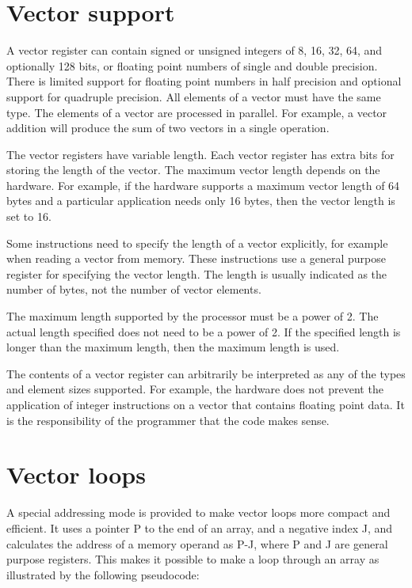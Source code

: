 \documentclass[forwardcom.tex]{subfiles}
\begin{document}
\section{Vector support}
A vector register can contain signed or unsigned integers of 8, 16, 32, 64, and optionally 128 bits, or floating point numbers of single and double precision. There is limited support for floating point numbers in half precision and optional support for quadruple precision. All elements of a vector must have the same type. The elements of a vector are processed in parallel. For example, a vector addition will produce the sum of two vectors in a single operation.
\vv

The vector registers have variable length. Each vector register has extra bits for storing the length of the vector. The maximum vector length depends on the hardware. 
For example, if the hardware supports a maximum vector length of 64 bytes and a particular application needs only 16 bytes, then the vector length is set to 16.
\vv

Some instructions need to specify the length of a vector explicitly, for example when reading a vector from memory. These instructions use a general purpose register for specifying the vector length. The length is usually indicated as the number of bytes, not the number of vector elements.
\vv

The maximum length supported by the processor must be a power of 2. The actual length specified does not need to be a power of 2. If the specified length is longer than the maximum length, then the maximum length is used.
\vv

The contents of a vector register can arbitrarily be interpreted as any of the types and element sizes supported. For example, the hardware does not prevent the application of integer instructions on a vector that contains floating point data. It is the responsibility of the programmer that the code makes sense.

\section{Vector loops} \label{vectorLoops}
A special addressing mode is provided to make vector loops more compact and efficient. It uses a pointer P to the end of an array, and a negative index J, and calculates the address of a memory operand as P-J, where P and J are general purpose registers. This makes it possible to make a loop through an array as illustrated by the following pseudocode:
\vv
\end{document}
